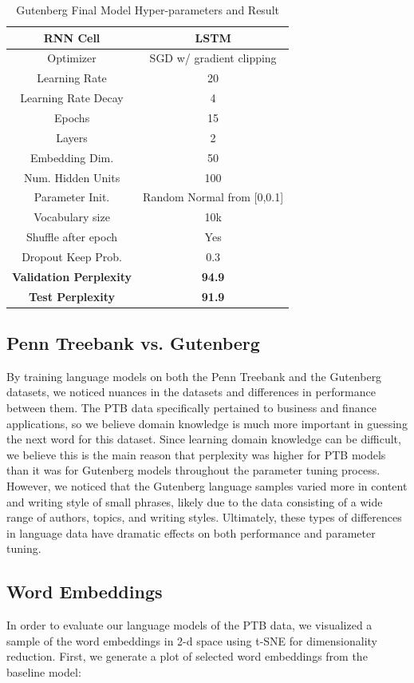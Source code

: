 \documentclass[a4paper]{article}
\begin{document}
\begin{table}[H]
\centering
\begin{tabular}{|c | c|} 
 \hline
RNN Cell & LSTM\\ \hline
Optimizer & SGD w/ gradient clipping \\ \hline
Learning Rate & 20 \\ \hline
Learning Rate Decay & 4 \\ \hline
Epochs & 15\\ \hline
Layers & 2\\ \hline
Embedding Dim. & 50\\ \hline
Num. Hidden Units & 100\\ \hline
Parameter Init. & Random Normal from [0,0.1]\\ \hline
Vocabulary size & 10k\\ \hline
Shuffle after epoch & Yes \\ \hline
Dropout Keep Prob. & 0.3 \\ \hline
\textbf{Validation Perplexity} &\textbf{94.9} \\ \hline
\textbf{Test Perplexity} &\textbf{91.9} \\ \hline
\end{tabular}
\caption{Gutenberg Final Model Hyper-parameters and Result}
\label{table:1}
\end{table}

\subsection{Penn Treebank vs. Gutenberg}
By training language models on both the Penn Treebank and the Gutenberg datasets, we noticed nuances in the datasets and differences in performance between them. The PTB data specifically pertained to business and finance applications, so we believe domain knowledge is much more important in guessing the next word for this dataset. Since learning domain knowledge can be difficult, we believe this is the main reason that perplexity was higher for PTB models than it was for Gutenberg models throughout the parameter tuning process. However, we noticed that the Gutenberg language samples varied more in content and writing style of small phrases, likely due to the data consisting of a wide range of authors, topics, and writing styles. Ultimately, these types of differences in language data have dramatic effects on both performance and parameter tuning.

\subsection{Word Embeddings}
In order to evaluate our language models of the PTB data, we visualized a sample of the word embeddings in 2-d space using t-SNE for dimensionality reduction. First, we generate a plot of selected word embeddings from the baseline model:
\end{document}

